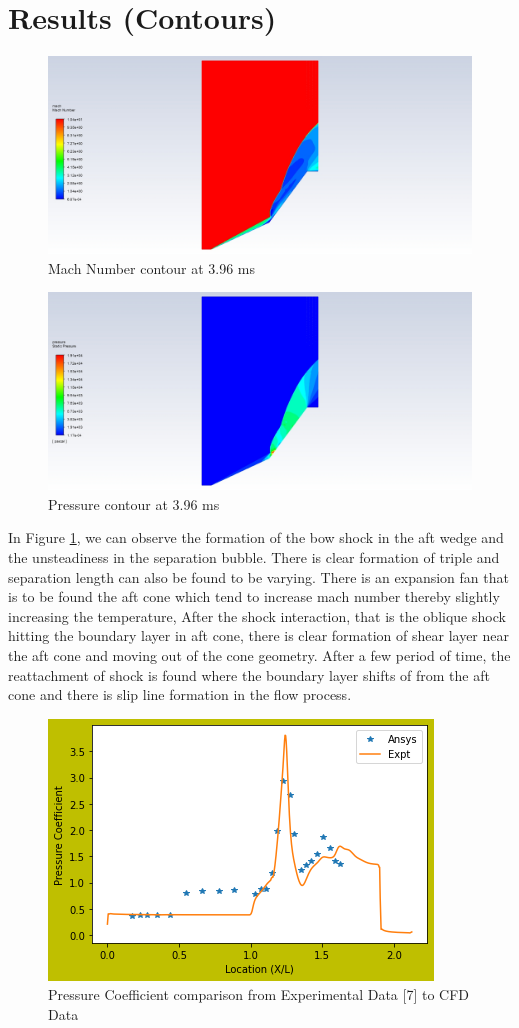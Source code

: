 \section{Results (Contours)}


\begin{figure}[ht]
\centering
  \includegraphics[width=0.7\linewidth]{images/mach_number_3663.jpeg}
  \caption{ Mach Number contour at 3.96 ms }
  \label{fig:mach_contour}
\end{figure}


\begin{figure}[ht]
\centering
  \includegraphics[width=0.7\linewidth]{images/pressure_contour_3669.jpeg}
  \caption{Pressure contour at 3.96 ms }
  \label{fig:pressure_contour}
\end{figure}
In Figure \ref{fig:mach_contour}, we can observe the formation of the bow shock in the aft wedge and the unsteadiness in the separation bubble. There is clear formation of triple and separation length can also be found to be varying. There is an expansion fan that is to be found the aft cone which tend to increase mach number thereby slightly increasing the temperature, After the shock interaction, that is the oblique shock hitting the boundary layer in aft cone, there is clear formation of shear layer near the aft cone and moving out of the cone geometry. After a few period of time, the reattachment of shock is found where the boundary layer shifts of from the aft cone and there is slip line formation in the flow process.

\begin{figure}[]
\centering
  \includegraphics[width=0.6\linewidth]{images/PressureCoefficient.png}
  \caption{ Pressure Coefficient comparison from Experimental Data [7] to CFD Data }
  \label{fig:Cp}
\end{figure}


